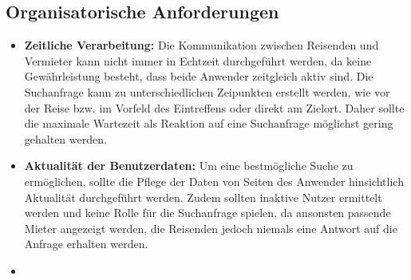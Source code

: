 \subsection{Organisatorische Anforderungen}          
\begin{itemize}
   \item
   \textbf{Zeitliche Verarbeitung:} Die Kommunikation zwischen Reisenden und Vermieter kann nicht immer in Echtzeit durchgeführt werden, da keine Gewährleistung besteht, dass beide Anwender zeitgleich aktiv sind. Die Suchanfrage kann zu unterschiedlichen Zeipunkten erstellt werden, wie vor der Reise bzw. im Vorfeld des Eintreffens oder direkt am Zielort. Daher sollte die maximale Wartezeit als Reaktion auf eine Suchanfrage möglichst gering gehalten werden. 

   \item 
   \textbf{Aktualität der Benutzerdaten:} Um eine bestmögliche Suche zu ermöglichen, sollte die Pflege der Daten von Seiten des Anwender hinsichtlich Aktualität durchgeführt werden. Zudem sollten inaktive Nutzer ermittelt werden und keine Rolle für die Suchanfrage spielen, da ansonsten passende Mieter angezeigt werden, die Reisenden jedoch niemals eine Antwort auf die Anfrage erhalten werden.

   \item
   \textbf{}

\end{itemize}
